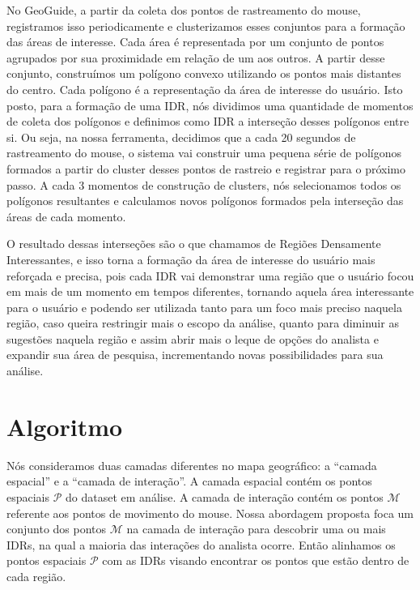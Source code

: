 No GeoGuide, a partir da coleta dos pontos de rastreamento do mouse, registramos isso periodicamente e clusterizamos esses conjuntos para a formação das áreas de interesse. Cada área é representada por um conjunto de pontos agrupados por sua proximidade em relação de um aos outros. A partir desse conjunto, construímos um polígono convexo utilizando os pontos mais distantes do centro. Cada polígono é a representação da área de interesse do usuário. Isto posto, para a formação de uma IDR, nós dividimos uma quantidade de momentos de coleta dos polígonos e definimos como IDR a interseção desses polígonos entre si. Ou seja, na nossa ferramenta, decidimos que a cada 20 segundos de rastreamento do mouse, o sistema vai construir uma pequena série de polígonos formados a partir do cluster desses pontos de rastreio e registrar para o próximo passo. A cada 3 momentos de construção de clusters, nós selecionamos todos os polígonos resultantes e calculamos novos polígonos formados pela interseção das áreas de cada momento.

O resultado dessas interseções são o que chamamos de Regiões Densamente Interessantes, e isso torna a formação da área de interesse do usuário mais reforçada e precisa, pois cada IDR vai demonstrar uma região que o usuário focou em mais de um momento em tempos diferentes, tornando aquela área interessante para o usuário e podendo ser utilizada tanto para um foco mais preciso naquela região, caso queira restringir mais o escopo da análise, quanto para diminuir as sugestões naquela região e assim abrir mais o leque de opções do analista e expandir sua área de pesquisa, incrementando novas possibilidades para sua análise.

\section{Algoritmo}

Nós consideramos duas camadas diferentes no mapa geográfico: a ``camada espacial'' e a ``camada de interação''. A camada espacial contém os pontos espaciais $\mathcal{P}$ do dataset em análise. A camada de interação  contém os pontos $\mathcal{M}$ referente aos pontos de movimento do mouse. Nossa abordagem proposta foca um conjunto dos pontos $\mathcal{M}$ na camada de interação para descobrir uma ou mais IDRs, na qual a maioria das interações do analista ocorre. Então alinhamos os pontos espaciais $\mathcal{P}$ com as IDRs visando encontrar os pontos que estão dentro de cada região. 

